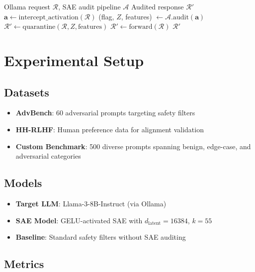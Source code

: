 \documentclass[11pt]{article}
\begin{document}
\begin{algorithm}[t]
\caption{Ollama Bridge Interception}
\label{alg:ollama_bridge}
\begin{algorithmic}[1]
\REQUIRE Ollama request $\mathcal{R}$, SAE audit pipeline $\mathcal{A}$
\ENSURE Audited response $\mathcal{R}'$
\STATE $\mathbf{a} \leftarrow \text{intercept\_activation}(\mathcal{R})$
\STATE (flag, $Z$, features) $\leftarrow \mathcal{A}.\text{audit}(\mathbf{a})$
    \STATE $\mathcal{R}' \leftarrow \text{quarantine}(\mathcal{R}, Z, \text{features})$
\ELSE
    \STATE $\mathcal{R}' \leftarrow \text{forward}(\mathcal{R})$
\ENDIF
\STATE \RETURN $\mathcal{R}'$
\end{algorithmic}
\end{algorithm}

\section{Experimental Setup}

\subsection{Datasets}

\begin{itemize}
    \item \textbf{AdvBench}: 60 adversarial prompts targeting safety filters~\cite{zou2023universal}
    \item \textbf{HH-RLHF}: Human preference data for alignment validation~\cite{bai2022constitutional}
    \item \textbf{Custom Benchmark}: 500 diverse prompts spanning benign, edge-case, and adversarial categories
\end{itemize}

\subsection{Models}

\begin{itemize}
    \item \textbf{Target LLM}: Llama-3-8B-Instruct (via Ollama)
    \item \textbf{SAE Model}: GELU-activated SAE with $d_{\text{latent}} = 16384$, $k = 55$
    \item \textbf{Baseline}: Standard safety filters without SAE auditing
\end{itemize}

\subsection{Metrics}
\end{document}
